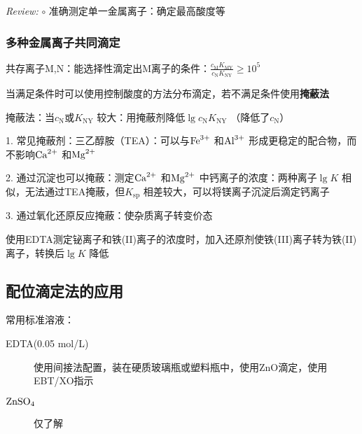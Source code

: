 \textit{Review:}
$\circ$ 准确测定单一金属离子：确定最高酸度等

\subsubsection*{多种金属离子共同滴定}%
\label{subsub:多种金属离子共同滴定}
共存离子M,N：能选择性滴定出M离子的条件：$\frac{c_\text{M}K_\text{MY}}{c_\text{N}K_\text{NY} }\ge 10^5$

当满足条件时可以使用控制酸度的方法分布滴定，若不满足条件使用\textbf{掩蔽法}
\begin{notation}
    掩蔽法：当$c_\text{N}$或$K_\text{NY}$ 较大：用掩蔽剂降低$\lg c_\text{N}K_\text{NY}$ （降低了$c_\text{N}$）
\end{notation}
1. 常见掩蔽剂：三乙醇胺（TEA）：可以与$\ce{Fe^3+}$ 和$\ce{Al^3+}$ 形成更稳定的配合物，而不影响$\ce{Ca^2+}$ 和$\ce{Mg^2+}$

2. 通过沉淀也可以掩蔽：测定$\ce{Ca^2+}$ 和$\ce{Mg^2+}$ 中钙离子的浓度：两种离子$\lg K$ 相似，无法通过TEA掩蔽，但$K_\text{sp}$ 相差较大，可以将镁离子沉淀后滴定钙离子

3. 通过氧化还原反应掩蔽：使杂质离子转变价态
\begin{eg}
    使用EDTA测定铋离子和铁(II)离子的浓度时，加入还原剂使铁(III)离子转为铁(II)离子，转换后$\lg K$ 降低
\end{eg}
\subsection{配位滴定法的应用}%
\label{sub:配位滴定法的应用}
常用标准溶液：
\begin{description}
    \item [EDTA(0.05 mol/L)] 使用间接法配置，装在硬质玻璃瓶或塑料瓶中，使用ZnO滴定，使用EBT/XO指示
    \item [$\ce{ZnSO_4}$ ] 仅了解
\end{description}
